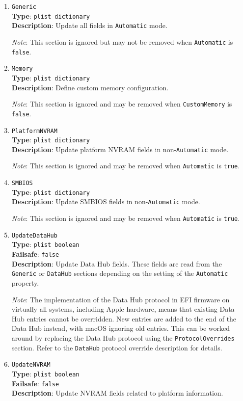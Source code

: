 \documentclass[]{article}
\begin{document}
\begin{enumerate}
  \emph{Note}: This section is ignored and may be removed when
  \texttt{Automatic} is \texttt{true}.

\item
  \texttt{Generic}\\
  \textbf{Type}: \texttt{plist\ dictionary}\\
  \textbf{Description}: Update all fields in \texttt{Automatic} mode.

  \emph{Note}: This section is ignored but may not be removed when
  \texttt{Automatic} is \texttt{false}.
\item
  \texttt{Memory}\\
  \textbf{Type}: \texttt{plist\ dictionary}\\
  \textbf{Description}: Define custom memory configuration.

  \emph{Note}: This section is ignored and may be removed when
  \texttt{CustomMemory} is \texttt{false}.
\item
  \texttt{PlatformNVRAM}\\
  \textbf{Type}: \texttt{plist\ dictionary}\\
  \textbf{Description}: Update platform NVRAM fields in non-\texttt{Automatic} mode.

  \emph{Note}: This section is ignored and may be removed when
  \texttt{Automatic} is \texttt{true}.
\item
  \texttt{SMBIOS}\\
  \textbf{Type}: \texttt{plist\ dictionary}\\
  \textbf{Description}: Update SMBIOS fields in non-\texttt{Automatic} mode.

  \emph{Note}: This section is ignored and may be removed when
  \texttt{Automatic} is \texttt{true}.
\item
  \texttt{UpdateDataHub}\\
  \textbf{Type}: \texttt{plist\ boolean}\\
  \textbf{Failsafe}: \texttt{false}\\
  \textbf{Description}: Update Data Hub fields. These fields are read
  from the \texttt{Generic} or \texttt{DataHub} sections depending on
  the setting of the \texttt{Automatic} property.

  \emph{Note}: The implementation of the Data Hub protocol in EFI firmware on
  virtually all systems, including Apple hardware, means that existing Data Hub
  entries cannot be overridden. New entries are added to the end of the Data Hub
  instead, with macOS ignoring old entries. This can be worked around by
  replacing the Data Hub protocol using the \texttt{ProtocolOverrides} section.
  Refer to the \texttt{DataHub} protocol override description for details.
\item
  \texttt{UpdateNVRAM}\\
  \textbf{Type}: \texttt{plist\ boolean}\\
  \textbf{Failsafe}: \texttt{false}\\
  \textbf{Description}: Update NVRAM fields related to platform information.


\end{enumerate}
\end{document}

